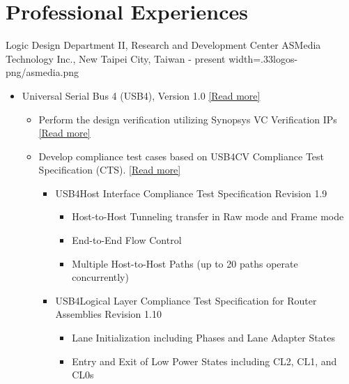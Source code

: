 \documentclass{cvclass}
\newcommand{\simplemmyy}[3]{\shortmmyyformat\formatdate{#3}{#2}{#1}}
\begin{document}
\makeinfo


\section{Professional Experiences}

    {Logic Design Department II, Research and Development Center}
    {ASMedia Technology Inc., New Taipei City, Taiwan}
    {\simplemmyy{2023}{7}{17} - present}
    {width=.33\linewidth}{logos-png/asmedia.png}
    {\begin{itemize}
        \item Universal Serial Bus 4 (USB4\textsuperscript{\tiny\textregistered}),  Version 1.0 \href{https://www.usb.org/usb4}{[Read more]}
        \begin{itemize}
            \item Perform the design verification utilizing Synopsys\textsuperscript{\tiny\textregistered} VC Verification IPs \href{https://www.synopsys.com/verification/verification-ip/subsystems/vc-verification-ip-usb4.html}{[Read more]}
            \item Develop compliance test cases based on USB4CV Compliance Test Specification (CTS). \href{https://www.usb.org/document-library/usb4cv-compliance-test-specification}{[Read more]}
            \begin{itemize}
                \item USB4\texttrademark Host Interface Compliance Test Specification Revision 1.9
                \begin{itemize}
                    \item Host-to-Host Tunneling transfer in Raw mode and Frame mode
                    \item End-to-End Flow Control
                    \item Multiple Host-to-Host Paths (up to 20 paths operate concurrently)
                \end{itemize}
                \item USB4\texttrademark Logical Layer Compliance Test Specification for Router Assemblies Revision 1.10
                \begin{itemize}
                    \item Lane Initialization including Phases and Lane Adapter States
                    \item Entry and Exit of Low Power States including CL2, CL1, and CL0s

\end{itemize}
\end{itemize}
\end{itemize}
\end{itemize}}
\end{document}
